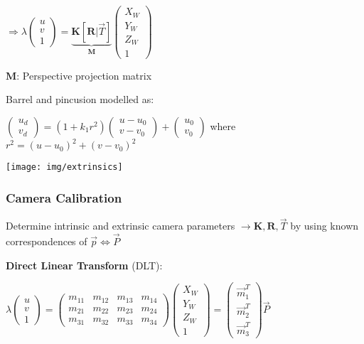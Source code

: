 \documentclass[fontsize=6pt]{scrartcl}
\newcommand{\mat}[1]{\mathbf{#1}}
\begin{document}
\begin{multicols*}{4}
\begin{minipage}{0.6\linewidth}
	$\Rightarrow \lambda \begin{pmatrix}
	u\\
	v\\
	1
	\end{pmatrix}
	=
	\underbrace{\mat K \left[\mat R | \vec T\right]}_{\mat M}
	\begin{pmatrix}
	X_W\\
	Y_W\\
	Z_W\\
	1
	\end{pmatrix}
	$

	$\mat M $: Perspective projection matrix

	Barrel and pincusion modelled as:

	$
	\begin{pmatrix}
		u_d\\
		v_d
	\end{pmatrix}
	= (1+k_1 r^2)
	\begin{pmatrix}
	u - u_0\\
	v - v_0
	\end{pmatrix}
	+
	\begin{pmatrix}
	u_0\\
	v_0
	\end{pmatrix}
	$
	where $r^2 = (u-u_0)^2 + (v-v_0)^2$
\end{minipage}
\begin{minipage}{0.4\linewidth}
	\texttt{[image: img/extrinsics]}
\end{minipage}

\subsubsection*{Camera Calibration}

Determine intrinsic and extrinsic camera parameters $\rightarrow \mat K, \mat R, \vec T$ by using known correspondences of $\vec p \Leftrightarrow \vec P$

\textbf{Direct Linear Transform} (DLT):

$\lambda\begin{pmatrix}
u\\
v\\
1
\end{pmatrix}
=
\begin{pmatrix}
m_{11} & m_{12} & m_{13} & m_{14}\\
m_{21} & m_{22} & m_{23} & m_{24}\\
m_{31} & m_{32} & m_{33} & m_{34}
\end{pmatrix}
\begin{pmatrix}
X_W\\
Y_W\\
Z_W\\
1
\end{pmatrix}
=
\begin{pmatrix}
\vec{m}_1^T\\
\vec{m}_2^T\\
\vec{m}_3^T
\end{pmatrix}
\vec{P}
$


\end{multicols*}
\end{document}

